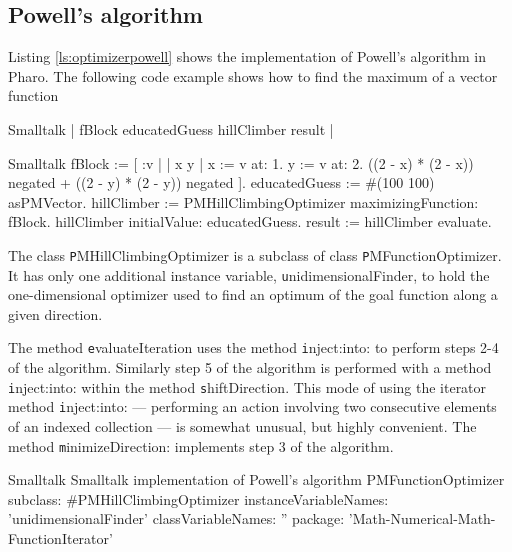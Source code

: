 \subsection{Powell's algorithm}
Listing \ref{ls:optimizerpowell} shows the implementation of Powell's algorithm
in Pharo.
The following code example shows how to find the maximum of a vector function
\begin{listing}[label=ex:spowell]{Smalltalk}
{}
 | fBlock educatedGuess hillClimber result |
\end{listing}
\begin{displaycode}{Smalltalk}
   fBlock := [ :v | 
   | x y |
   x := v at: 1.
   y := v at: 2.
   ((2 - x) * (2 - x)) negated + ((2 - y) * (2 - y)) negated ].
   educatedGuess := #(100 100) asPMVector.  
   hillClimber := PMHillClimbingOptimizer maximizingFunction: fBlock.
   hillClimber initialValue: educatedGuess.
   result := hillClimber evaluate.
\end{displaycode}
The class {\texttt PMHillClimbingOptimizer} is a subclass of class
{\texttt PMFunctionOptimizer}. It has only one additional instance
variable, {\texttt unidimensionalFinder}, to hold the one-dimensional
optimizer used to find an optimum of the goal function along a
given direction.

The method {\texttt evaluateIteration} uses the method {\texttt
inject:into:} to perform steps 2-4 of the algorithm. Similarly
step 5 of the algorithm is performed with a method {\texttt
inject:into:} within the method {\texttt shiftDirection}. This mode of
using the iterator method {\texttt inject:into:} --- performing an
action involving two consecutive elements of an indexed collection
--- is somewhat unusual, but highly convenient\cite{Beck}. The method {\texttt
minimizeDirection:} implements step 3 of the algorithm.

\begin{listing}[label=ls:optimizerpowell]{Smalltalk}
{Smalltalk implementation of Powell's algorithm}
PMFunctionOptimizer subclass: #PMHillClimbingOptimizer
   instanceVariableNames: 'unidimensionalFinder'
   classVariableNames: ''
   package: 'Math-Numerical-Math-FunctionIterator'
\end{listing}

